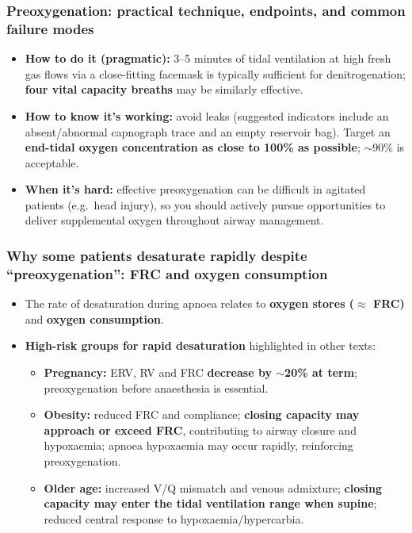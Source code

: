 \documentclass[11pt,a4paper]{article}
\begin{document}
\subsubsection{Preoxygenation: practical technique, endpoints, and common failure modes}
\begin{itemize}
  \item \textbf{How to do it (pragmatic):} 3--5 minutes of tidal ventilation at high fresh gas flows via a close-fitting facemask is typically sufficient for denitrogenation; \textbf{four vital capacity breaths} may be similarly effective.
  \item \textbf{How to know it’s working:} avoid leaks (suggested indicators include an absent/abnormal capnograph trace and an empty reservoir bag). Target an \textbf{end-tidal oxygen concentration as close to 100\% as possible}; $\sim$90\% is acceptable.
  \item \textbf{When it’s hard:} effective preoxygenation can be difficult in agitated patients (e.g.\ head injury), so you should actively pursue opportunities to deliver supplemental oxygen throughout airway management.
\end{itemize}

\subsubsection{Why some patients desaturate rapidly despite ``preoxygenation'': FRC and oxygen consumption}
\begin{itemize}
  \item The rate of desaturation during apnoea relates to \textbf{oxygen stores ($\approx$ FRC)} and \textbf{oxygen consumption}.
  \item \textbf{High-risk groups for rapid desaturation} highlighted in other texts:
  \begin{itemize}
    \item \textbf{Pregnancy:} ERV, RV and FRC \textbf{decrease by $\sim$20\% at term}; preoxygenation before anaesthesia is essential.
    \item \textbf{Obesity:} reduced FRC and compliance; \textbf{closing capacity may approach or exceed FRC}, contributing to airway closure and hypoxaemia; apnoea hypoxaemia may occur rapidly, reinforcing preoxygenation.
    \item \textbf{Older age:} increased V/Q mismatch and venous admixture; \textbf{closing capacity may enter the tidal ventilation range when supine}; reduced central response to hypoxaemia/hypercarbia.
  \end{itemize}
\end{itemize}
\end{document}
